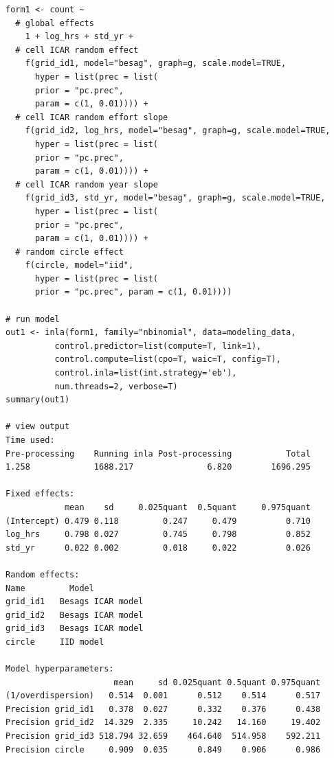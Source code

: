 \documentclass[]{article}
\begin{document}
\begin{verbatim}
form1 <- count ~
  # global effects
    1 + log_hrs + std_yr +
  # cell ICAR random effect
    f(grid_id1, model="besag", graph=g, scale.model=TRUE,
      hyper = list(prec = list(
      prior = "pc.prec",
      param = c(1, 0.01)))) +
  # cell ICAR random effort slope
    f(grid_id2, log_hrs, model="besag", graph=g, scale.model=TRUE,
      hyper = list(prec = list(
      prior = "pc.prec",
      param = c(1, 0.01)))) +
  # cell ICAR random year slope
    f(grid_id3, std_yr, model="besag", graph=g, scale.model=TRUE,
      hyper = list(prec = list(
      prior = "pc.prec",
      param = c(1, 0.01)))) +
  # random circle effect
    f(circle, model="iid",
      hyper = list(prec = list(
      prior = "pc.prec", param = c(1, 0.01))))

# run model
out1 <- inla(form1, family="nbinomial", data=modeling_data,
          control.predictor=list(compute=T, link=1),
          control.compute=list(cpo=T, waic=T, config=T),
          control.inla=list(int.strategy='eb'),
          num.threads=2, verbose=T)
summary(out1)

# view output
Time used:
Pre-processing    Running inla Post-processing           Total 
1.258             1688.217               6.820        1696.295 

Fixed effects:
            mean    sd     0.025quant  0.5quant     0.975quant
(Intercept) 0.479 0.118         0.247     0.479          0.710
log_hrs     0.798 0.027         0.745     0.798          0.852
std_yr      0.022 0.002         0.018     0.022          0.026

Random effects:
Name	     Model
grid_id1   Besags ICAR model 
grid_id2   Besags ICAR model 
grid_id3   Besags ICAR model 
circle     IID model 

Model hyperparameters:
                      mean     sd 0.025quant 0.5quant 0.975quant
(1/overdispersion)   0.514  0.001      0.512    0.514      0.517
Precision grid_id1   0.378  0.027      0.332    0.376      0.438
Precision grid_id2  14.329  2.335     10.242   14.160     19.402
Precision grid_id3 518.794 32.659    464.640  514.958    592.211
Precision circle     0.909  0.035      0.849    0.906      0.986

\end{verbatim}
\end{document}
